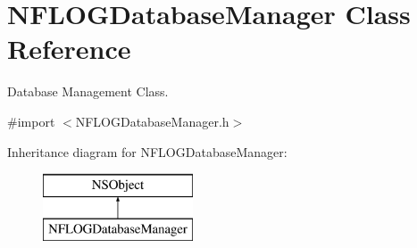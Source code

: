 \hypertarget{interface_n_f_l_o_g_database_manager}{}\section{N\+F\+L\+O\+G\+Database\+Manager Class Reference}
\label{interface_n_f_l_o_g_database_manager}


Database Management Class.  




{\ttfamily \#import $<$N\+F\+L\+O\+G\+Database\+Manager.\+h$>$}

Inheritance diagram for N\+F\+L\+O\+G\+Database\+Manager\+:\begin{figure}[H]
\begin{center}
\leavevmode
\includegraphics[height=2.000000cm]{interface_n_f_l_o_g_database_manager}
\end{center}
\end{figure}
